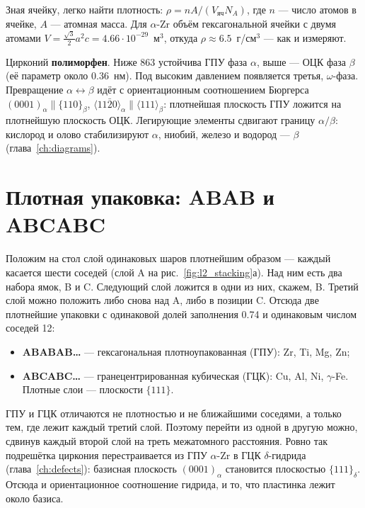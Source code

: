 Зная ячейку, легко найти плотность: $\rho = nA/(V_{\text{яч}}N_A)$, где $n$ --- число атомов в ячейке, $A$ ---
атомная масса. Для $\alpha$-Zr объём гексагональной ячейки с двумя атомами $V = \tfrac{\sqrt3}{2}a^2c =
4.66\cdot10^{-29}$~м$^3$, откуда $\rho\approx6.5$~г/см$^3$ --- как и измеряют.

\begin{zrbox}
Цирконий \textbf{полиморфен}. Ниже 863\degC{} устойчива ГПУ фаза $\alpha$, выше --- ОЦК фаза $\beta$ (её
параметр около 0.36~нм). Под высоким давлением появляется третья, $\omega$-фаза. Превращение $\alpha\leftrightarrow\beta$
идёт с ориентационным соотношением Бюргерса $(0001)_\alpha\parallel\{110\}_\beta$,
$\langle11\bar20\rangle_\alpha\parallel\langle111\rangle_\beta$: плотнейшая плоскость ГПУ ложится на плотнейшую
плоскость ОЦК. Легирующие элементы сдвигают границу $\alpha/\beta$: кислород и олово стабилизируют $\alpha$,
ниобий, железо и водород --- $\beta$ (глава~\ref{ch:diagrams}).
\end{zrbox}

\section{Плотная упаковка: ABAB и ABCABC}

Положим на стол слой одинаковых шаров плотнейшим образом --- каждый касается шести соседей (слой A на
рис.~\ref{fig:l2_stacking}а). Над ним есть два набора ямок, B и C. Следующий слой ложится в одни из них, скажем, B.
Третий слой можно положить либо снова над A, либо в позиции C. Отсюда две плотнейшие упаковки с одинаковой
долей заполнения 0.74 и одинаковым числом соседей 12:
\begin{itemize}
\item \textbf{ABABAB\ldots} --- гексагональная плотноупакованная (ГПУ): Zr, Ti, Mg, Zn;
\item \textbf{ABCABC\ldots} --- гранецентрированная кубическая (ГЦК): Cu, Al, Ni, $\gamma$-Fe. Плотные слои --- плоскости $\{111\}$.
\end{itemize}


\begin{idea}
ГПУ и ГЦК отличаются не плотностью и не ближайшими соседями, а только тем, где лежит каждый третий слой. Поэтому
перейти из одной в другую можно, сдвинув каждый второй слой на треть межатомного расстояния. Ровно так подрешётка
циркония перестраивается из ГПУ $\alpha$-Zr в ГЦК $\delta$-гидрида (глава~\ref{ch:defects}): базисная плоскость
$(0001)_\alpha$ становится плоскостью $\{111\}_\delta$. Отсюда и ориентационное соотношение гидрида, и то, что
пластинка лежит около базиса.
\end{idea}

